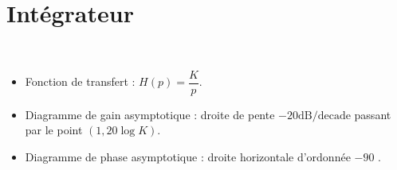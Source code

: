 \documentclass[10pt,fleqn]{article} %
\begin{document}
\section{Intégrateur}
\begin{resultat} ~\\

\vspace{-.5cm}

\noindent\begin{minipage}[c]{.53\linewidth}
\begin{itemize}
\item Fonction de transfert : $H(p)=\dfrac{K}{p}$.
\item Diagramme de gain asymptotique : droite de pente $-{20}\text{dB/decade}$ passant par le point $(1,20\log K)$.
\item Diagramme de phase asymptotique : droite horizontale d'ordonnée $-90$ \degre.
\end{itemize}
\end{minipage} \hfill
\begin{minipage}[c]{.45\linewidth}
\end{minipage}
\end{resultat}
\end{document}
